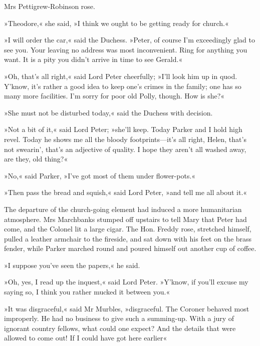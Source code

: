Mrs Pettigrew-Robinson rose.

»Theodore,« she said, »I think we ought to be getting ready for church.«

»I will order the car,« said the Duchess. »Peter, of course I'm exceedingly glad to see you. Your leaving no address was most inconvenient. Ring for anything you want. It is a pity you didn't arrive in time to see Gerald.«

»Oh, that's all right,« said Lord Peter cheerfully; »I'll look him up in quod. Y'know, it's rather a good idea to keep one's crimes in the family; one has so many more facilities. I'm sorry for poor old Polly, though. How is she?«

»She must not be disturbed today,« said the Duchess with decision.

»Not a bit of it,« said Lord Peter; »she'll keep. Today Parker and I hold high revel. Today he shows me all the bloody footprints\allowbreak---\allowbreak it's all right, Helen, that's not swearin', that's an adjective of quality. I hope they aren't all washed away, are they, old thing?«

»No,« said Parker, »I've got most of them under flower-pots.«

»Then pass the bread and squish,« said Lord Peter, »and tell me all about it.«

The departure of the church-going element had induced a more humanitarian atmosphere. Mrs Marchbanks stumped off upstairs to tell Mary that Peter had come, and the Colonel lit a large cigar. The Hon.  Freddy rose, stretched himself, pulled a leather armchair to the fireside, and sat down with his feet on the brass fender, while Parker marched round and poured himself out another cup of coffee.

»I suppose you've seen the papers,« he said.

»Oh, yes, I read up the inquest,« said Lord Peter. »Y'know, if you'll excuse my saying so, I think you rather mucked it between you.«

»It was disgraceful,« said Mr Murbles, »disgraceful. The Coroner behaved most improperly. He had no business to give such a summing-up.  With a jury of ignorant country fellows, what could one expect? And the details that were allowed to come out! If I could have got here earlier\longdash«

